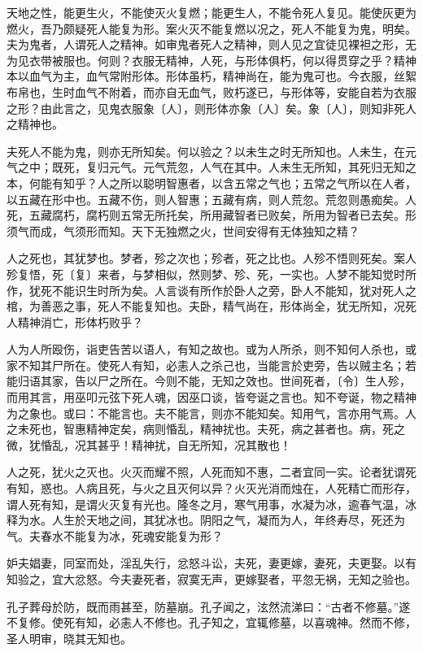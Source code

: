 \documentclass[]{article}
\begin{document}
天地之性，能更生火，不能使灭火复燃；能更生人，不能令死人复见。能使灰更为燃火，吾乃颇疑死人能复为形。案火灭不能复燃以况之，死人不能复为鬼，明矣。夫为鬼者，人谓死人之精神。如审鬼者死人之精神，则人见之宜徒见裸袒之形，无为见衣带被服也。何则？衣服无精神，人死，与形体俱朽，何以得贯穿之乎？精神本以血气为主，血气常附形体。形体虽朽，精神尚在，能为鬼可也。今衣服，丝絮布帛也，生时血气不附着，而亦自无血气，败朽遂已，与形体等，安能自若为衣服之形？由此言之，见鬼衣服象〔人〕，则形体亦象〔人〕矣。象〔人〕，则知非死人之精神也。

夫死人不能为鬼，则亦无所知矣。何以验之？以未生之时无所知也。人未生，在元气之中；既死，复归元气。元气荒忽，人气在其中。人未生无所知，其死归无知之本，何能有知乎？人之所以聪明智惠者，以含五常之气也；五常之气所以在人者，以五藏在形中也。五藏不伤，则人智惠；五藏有病，则人荒忽。荒忽则愚痴矣。人死，五藏腐朽，腐朽则五常无所托矣，所用藏智者已败矣，所用为智者已去矣。形须气而成，气须形而知。天下无独燃之火，世间安得有无体独知之精？

人之死也，其犹梦也。梦者，殄之次也；殄者，死之比也。人殄不悟则死矣。案人殄复悟，死〔复〕来者，与梦相似，然则梦、殄、死，一实也。人梦不能知觉时所作，犹死不能识生时所为矣。人言谈有所作於卧人之旁，卧人不能知，犹对死人之棺，为善恶之事，死人不能复知也。夫卧，精气尚在，形体尚全，犹无所知，况死人精神消亡，形体朽败乎？

人为人所殴伤，诣吏告苦以语人，有知之故也。或为人所杀，则不知何人杀也，或家不知其尸所在。使死人有知，必恚人之杀己也，当能言於吏旁，告以贼主名；若能归语其家，告以尸之所在。今则不能，无知之效也。世间死者，〔令〕生人殄，而用其言，用巫叩元弦下死人魂，因巫口谈，皆夸诞之言也。知不夸诞，物之精神为之象也。或曰：不能言也。夫不能言，则亦不能知矣。知用气，言亦用气焉。人之未死也，智惠精神定矣，病则惛乱，精神扰也。夫死，病之甚者也。病，死之微，犹惛乱，况其甚乎！精神扰，自无所知，况其散也！

人之死，犹火之灭也。火灭而耀不照，人死而知不惠，二者宜同一实。论者犹谓死有知，惑也。人病且死，与火之且灭何以异？火灭光消而烛在，人死精亡而形存，谓人死有知，是谓火灭复有光也。隆冬之月，寒气用事，水凝为冰，逾春气温，冰释为水。人生於天地之间，其犹冰也。阴阳之气，凝而为人，年终寿尽，死还为气。夫春水不能复为冰，死魂安能复为形？

妒夫娼妻，同室而处，淫乱失行，忿怒斗讼，夫死，妻更嫁，妻死，夫更娶。以有知验之，宜大忿怒。今夫妻死者，寂寞无声，更嫁娶者，平忽无祸，无知之验也。

孔子葬母於防，既而雨甚至，防墓崩。孔子闻之，泫然流涕曰：``古者不修墓。''遂不复修。使死有知，必恚人不修也。孔子知之，宜辄修墓，以喜魂神。然而不修，圣人明审，晓其无知也。
\end{document}
